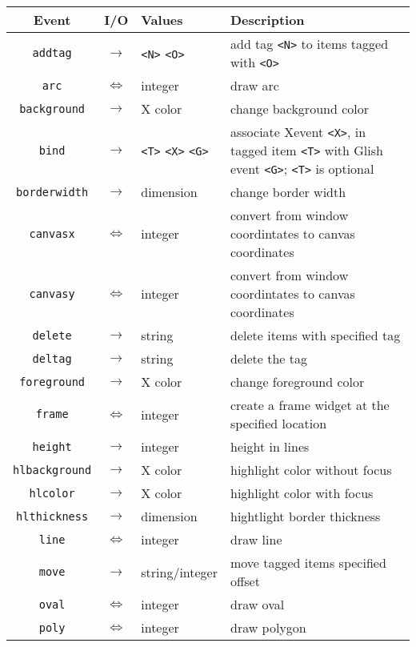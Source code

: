 \begin{table}[tbh]
{\small
\begin{center}
\begin{tabular}{|c|c|p{0.6in}|p{3.3in}|}
\hline
Event & I/O & Values & Description \\
\hline
\hline
{\tt addtag}	&$\rightarrow$&\verb+<N>+ \verb+<O>+& add tag \verb+<N>+ to items tagged with \verb+<O>+ \\ \hline
{\tt arc}	&$\Leftrightarrow$&integer& draw arc \\ \hline
{\tt background}&$\rightarrow$& X color & change background color \\ \hline
{\tt bind}	&$\rightarrow$&\verb+<T>+ \verb+<X>+ \verb+<G>+& associate Xevent \verb+<X>+, in tagged item \verb+<T>+ with Glish event \verb+<G>+; \verb+<T>+ is optional \\ \hline
{\tt borderwidth}&$\rightarrow$& dimension & change border width \\ \hline
{\tt canvasx}   &$\Leftrightarrow$&integer& convert from window coordintates to canvas coordinates \\ \hline
{\tt canvasy}	&$\Leftrightarrow$&integer& convert from window coordintates to canvas coordinates \\ \hline
{\tt delete}	&$\rightarrow$&string& delete items with specified tag \\ \hline
{\tt deltag}	&$\rightarrow$&string& delete the tag \\ \hline
{\tt foreground}&$\rightarrow$& X color & change foreground color \\ \hline
{\tt frame}	&$\Leftrightarrow$&integer& create a frame widget at the specified location \\ \hline
{\tt height}	&$\rightarrow$&integer& height in lines \\ \hline
{\tt hlbackground}&$\rightarrow$& X color & highlight color without focus \\ \hline
{\tt hlcolor}	&$\rightarrow$& X color & highlight color with focus \\ \hline
{\tt hlthickness}&$\rightarrow$& dimension & hightlight border thickness \\ \hline
{\tt line}	&$\Leftrightarrow$&integer& draw line \\ \hline
{\tt move}	&$\rightarrow$&string/integer& move tagged items specified offset \\ \hline
{\tt oval}	&$\Leftrightarrow$&integer& draw oval \\ \hline
{\tt poly}	&$\Leftrightarrow$&integer& draw polygon \\ \hline

\end{tabular}
\end{center}}
\end{table}
